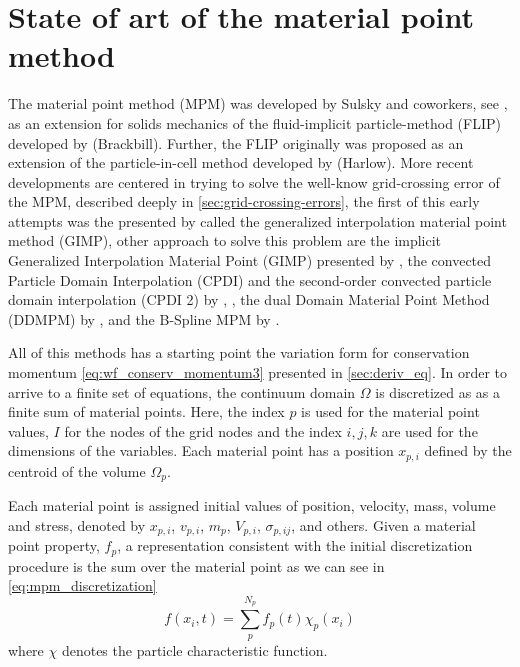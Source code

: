 
\section{State of art of the material point method}
\label{sec:state-art-material}

The material point method (MPM) was developed by Sulsky and coworkers,
see \cite{Schreyer1994}, as an extension for solids mechanics of the
fluid-implicit particle-method (FLIP) developed by (Brackbill). Further, the
FLIP originally was proposed as an extension of the particle-in-cell
method developed by (Harlow). More recent developments are centered in
trying to solve the well-know grid-crossing error of the MPM,
described deeply in \ref{sec:grid-crossing-errors}, the first of this early attempts was the
presented by \cite{Bardenhagen2004} called the generalized interpolation
material point method (GIMP), other approach to solve this problem are
the implicit Generalized Interpolation Material Point (GIMP) presented
by \cite{Charlton2017}, the convected Particle Domain Interpolation
(CPDI) and the second-order convected particle domain interpolation
(CPDI 2) by \cite{Sadeghirad2013}, \cite{Sadeghirad2013a}, the dual
Domain Material Point Method (DDMPM) by \cite{Zhang2011}, and the
B-Spline MPM by \cite{Bing2019}.

All of this methods has a starting point the variation form for
conservation momentum \eqref{eq:wf_conserv_momentum3} presented in
\ref{sec:deriv_eq}. In order to arrive to a finite set of equations,
the continuum domain $\Omega$ is discretized as as a finite sum of
material points. Here, the index $p$ is used for the material point
values, $I$ for the nodes of the grid nodes and the index $i,j,k$ are
used for the dimensions of the variables. Each material point has a
position $x_{p,i}$ defined by the centroid of the volume $\Omega_p$.

Each material point is assigned initial values of position, velocity,
mass, volume and stress, denoted by $x_{p,i}$, $v_{p,i}$, $m_{p}$, $V_{p,i}$,
$\sigma_{p,ij}$, and others. Given a material point property, $f_p$, a
representation consistent with the initial discretization procedure is
the sum over the material point as we can see in \eqref{eq:mpm_discretization}
\begin{equation}
  \label{eq:mpm_discretization}
  f(x_i,t) = \sum_p^{N_p} f_p(t) \chi_p(x_i)
\end{equation}
where $\chi$ denotes the particle characteristic function.

